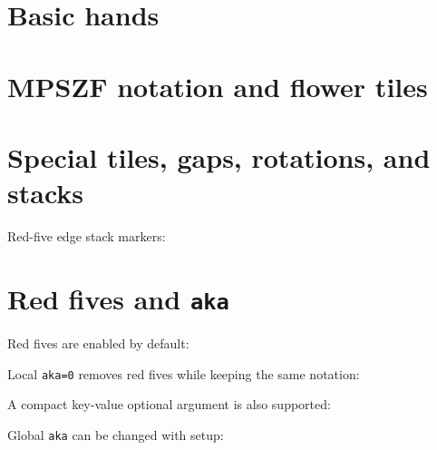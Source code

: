 \documentclass{article}
\begin{document}
\section*{Basic hands}




\section*{MPSZF notation and flower tiles}




\section*{Special tiles, gaps, rotations, and stacks}




Red-five edge stack markers:



\section*{Red fives and \texttt{aka}}

Red fives are enabled by default:


Local \texttt{aka=0} removes red fives while keeping the same notation:


A compact key-value optional argument is also supported:


Global \texttt{aka} can be changed with setup:


\end{document}
